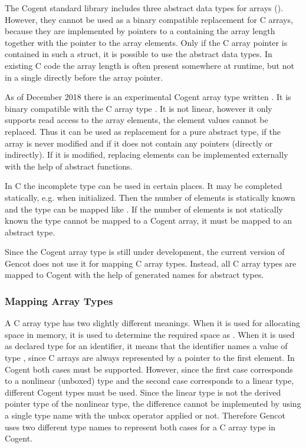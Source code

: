 The Cogent standard library includes three abstract data types for arrays (). 
However, they cannot be used as a binary compatible replacement for C arrays, because they are implemented by 
pointers to a  containing the array length together with the pointer to the array elements. 
Only if the C array pointer is contained in such a struct, it is possible to use the abstract data types. 
In existing C code the array length is often present somewhere at runtime, but not in a single 
directly before the array pointer.

As of December 2018 there is an experimental Cogent array type written . It is binary compatible 
with the C array type . It is not linear, however it only supports read access to the array elements, 
the element values cannot be replaced. Thus it can be used as replacement for a pure abstract type, if the array 
is never modified and if it does not contain any pointers (directly or indirectly). If it is modified, replacing
elements can be implemented externally with the help of abstract functions.

In C the incomplete type  can be used in certain places. It may be completed statically, e.g. 
when initialized. Then the number of elements is statically known and the type can be mapped like .
If the number of elements is not statically known the type cannot be mapped to a Cogent array, it must be mapped 
to an abstract type.

Since the Cogent array type is still under development, the current version of Gencot does not use it for
mapping C array types. Instead, all C array types are mapped to Cogent with the help of generated names for 
abstract types.

\subsubsection{Mapping Array Types}

A C array type  has two slightly different meanings. When it is used for allocating space in memory,
it is used to determine the required space as . When it is used as declared type for an 
identifier, it means that the identifier names a value of type , since C arrays are always represented
by a pointer to the first element. In Cogent both cases must be supported. However, since the first case 
corresponds to a nonlinear (unboxed) type and the second case corresponds to a linear type, different Cogent
types must be used. Since the linear type is not the derived pointer type of the nonlinear type, the 
difference cannot be implemented by using a single type name with the unbox operator applied or not. Therefore
Gencot uses two different type names to represent both cases for a C array type in Cogent.

